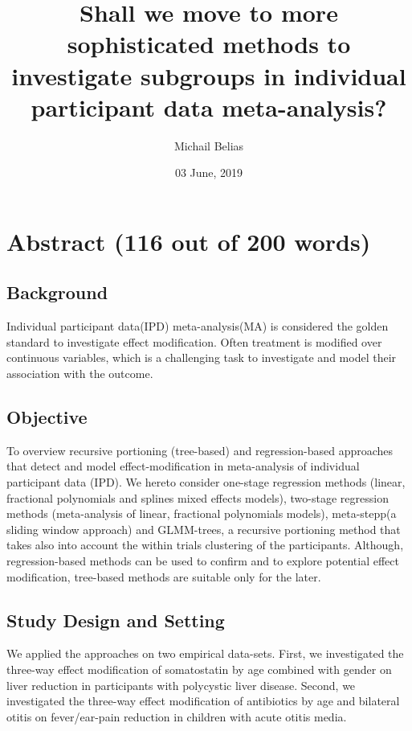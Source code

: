\documentclass[14pt,]{article}
\title{Shall we move to more sophisticated methods to investigate subgroups in
individual participant data meta-analysis?}
\author{Michail Belias}
\date{03 June, 2019}
\begin{document}
\maketitle

\hypertarget{abstract-116-out-of-200-words}{%
\section{Abstract (116 out of 200
words)}\label{abstract-116-out-of-200-words}}

\hypertarget{background}{%
\subsection{Background}\label{background}}

Individual participant data(IPD) meta-analysis(MA) is considered the
golden standard to investigate effect modification. Often treatment is
modified over continuous variables, which is a challenging task to
investigate and model their association with the outcome.

\hypertarget{objective}{%
\subsection{Objective}\label{objective}}

To overview recursive portioning (tree-based) and regression-based
approaches that detect and model effect-modification in meta-analysis of
individual participant data (IPD). We hereto consider one-stage
regression methods (linear, fractional polynomials and splines mixed
effects models), two-stage regression methods (meta-analysis of linear,
fractional polynomials models), meta-stepp(a sliding window approach)
and GLMM-trees, a recursive portioning method that takes also into
account the within trials clustering of the participants. Although,
regression-based methods can be used to confirm and to explore potential
effect modification, tree-based methods are suitable only for the later.

\hypertarget{study-design-and-setting}{%
\subsection{Study Design and Setting}\label{study-design-and-setting}}

We applied the approaches on two empirical data-sets. First, we
investigated the three-way effect modification of somatostatin by age
combined with gender on liver reduction in participants with polycystic
liver disease. Second, we investigated the three-way effect modification
of antibiotics by age and bilateral otitis on fever/ear-pain reduction
in children with acute otitis media.
\end{document}
